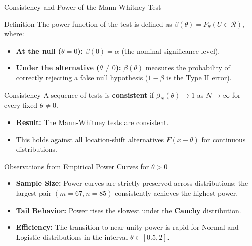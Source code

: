\documentclass[8pt]{beamer}
\begin{document}
\begin{frame}{Consistency and Power of the Mann-Whitney Test}
    \footnotesize
    \begin{block}{Definition}
        The power function of the test is defined as $\beta(\theta) = P_\theta(U \in \mathcal{R})$, where:
        \begin{itemize}
            \item \textbf{At the null ($\theta=0$):} $\beta(0) = \alpha$ (the nominal significance level).
            \item \textbf{Under the alternative ($\theta \neq 0$):} $\beta(\theta)$ measures the probability of correctly rejecting a false null hypothesis ($1 - \beta$ is the Type II error).
        \end{itemize}
    \end{block}

    \begin{block}{Consistency}
        A sequence of tests is \textbf{consistent} if $\beta_N(\theta) \to 1$ as $N \to \infty$ for every fixed $\theta \neq 0$.
        \begin{itemize}
            \item \textbf{Result:} The Mann-Whitney tests are consistent.
            \item This holds against all location-shift alternatives $F(x - \theta)$ for continuous distributions.
        \end{itemize}
    \end{block}

    \begin{block}{Observations from Empirical Power Curves for $\theta > 0$}
        \begin{itemize}
            \item \textbf{Sample Size:} Power curves are strictly preserved across distributions; the largest pair $(m=67, n=85)$ consistently achieves the highest power.
            \item \textbf{Tail Behavior:} Power rises the slowest under the \textbf{Cauchy} distribution.
            \item \textbf{Efficiency:} The transition to near-unity power is rapid for Normal and Logistic distributions in the interval $\theta \in [0.5, 2]$.
        \end{itemize}
    \end{block}
\end{frame}
\end{document}
